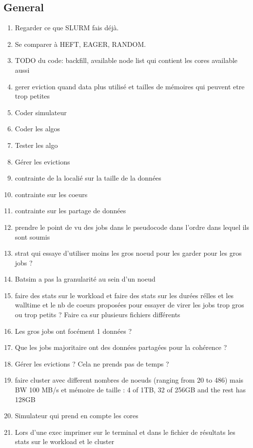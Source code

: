 \documentclass[a4paper]{article}
\begin{document}
	\subsection{General}
		\begin{enumerate}
			\item Regarder ce que SLURM fais déjà.
			\item Se comparer à HEFT, EAGER, RANDOM.
			\item TODO du code: backfill, available node list qui contient les cores available aussi
			\item gerer eviction quand data plus utilisé et tailles de mémoires qui peuvent etre trop petites
			\item Coder simulateur
			\item Coder les algos
			\item Tester les algo
			\item Gérer les evictions
			\item contrainte de la localié sur la taille de la données
			\item contrainte sur les coeurs
			\item contrainte sur les partage de données
			\item prendre le point de vu des jobs dans le pseudocode dans l'ordre dans lequel ils sont soumis
			\item strat qui essaye d'utiliser moins les gros noeud pour les garder pour les gros jobs ?
			\item Batsim a pas la granularité au sein d'un noeud
			\item faire des stats sur le workload et faire des stats sur les durées rélles et les walltime et le nb de coeurs proposées pour essayer de virer les jobs trop gros ou trop petits ? Faire ca sur plusieurs fichiers différents
			\item Les gros jobs ont focément 1 données ?
			\item Que les jobs majoritaire ont des données partagées pour la cohérence ?
			\item Gérer les evictions ? Cela ne prends pas de temps ?
			\item faire cluster avec different nombres de noeuds (ranging from 20 to 486) mais BW 100 MB/s et mémoire de taille : 4 of 1TB, 32 of 256GB and the rest has 128GB
			\item Simulateur qui prend en compte les cores
			\item Lors d'une exec imprimer sur le terminal et dans le fichier de résultats les stats sur le workload et le cluster

\end{enumerate}
\end{document}
